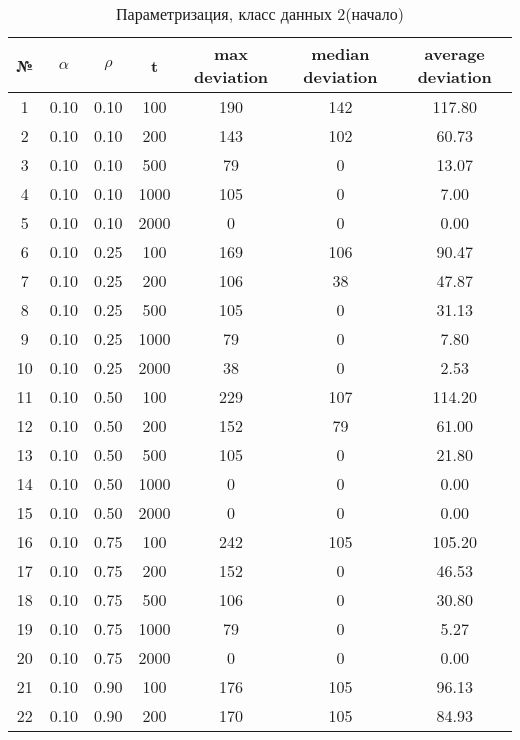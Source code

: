 \documentclass[a4paper, 12pt, unknownkeysallowed]{extreport}
\begin{document}
\begin{center}
  \captionsetup{justification=raggedright,singlelinecheck=off}
  \begin{longtable}[c]{|c|c|c|c|c|c|c|}
  \caption{Параметризация, класс данных 2(начало)\label{tbl:p_2_1}} \\ \hline
  № & $\alpha$ & $\rho$ & t & max deviation & median deviation & average deviation \\ \hline   
  1 & 0.10 & 0.10 &   100 &  190 &  142 & 117.80 \\ \hline
  2 & 0.10 & 0.10 &   200 &  143 &  102 & 60.73 \\ \hline
  3 & 0.10 & 0.10 &   500 &   79 &    0 & 13.07 \\ \hline
  4 & 0.10 & 0.10 &  1000 &  105 &    0 &  7.00 \\ \hline
  5 & 0.10 & 0.10 &  2000 &    0 &    0 &  0.00 \\ \hline
  6 & 0.10 & 0.25 &   100 &  169 &  106 & 90.47 \\ \hline
  7 & 0.10 & 0.25 &   200 &  106 &   38 & 47.87 \\ \hline
  8 & 0.10 & 0.25 &   500 &  105 &    0 & 31.13 \\ \hline
  9 & 0.10 & 0.25 &  1000 &   79 &    0 &  7.80 \\ \hline
 10 & 0.10 & 0.25 &  2000 &   38 &    0 &  2.53 \\ \hline
 11 & 0.10 & 0.50 &   100 &  229 &  107 & 114.20 \\ \hline
 12 & 0.10 & 0.50 &   200 &  152 &   79 & 61.00 \\ \hline
 13 & 0.10 & 0.50 &   500 &  105 &    0 & 21.80 \\ \hline
 14 & 0.10 & 0.50 &  1000 &    0 &    0 &  0.00 \\ \hline
 15 & 0.10 & 0.50 &  2000 &    0 &    0 &  0.00 \\ \hline
 16 & 0.10 & 0.75 &   100 &  242 &  105 & 105.20 \\ \hline
 17 & 0.10 & 0.75 &   200 &  152 &    0 & 46.53 \\ \hline
 18 & 0.10 & 0.75 &   500 &  106 &    0 & 30.80 \\ \hline
 19 & 0.10 & 0.75 &  1000 &   79 &    0 &  5.27 \\ \hline
 20 & 0.10 & 0.75 &  2000 &    0 &    0 &  0.00 \\ \hline
 21 & 0.10 & 0.90 &   100 &  176 &  105 & 96.13 \\ \hline
 22 & 0.10 & 0.90 &   200 &  170 &  105 & 84.93 \\ \hline

\end{longtable}
\end{center}
\end{document}
